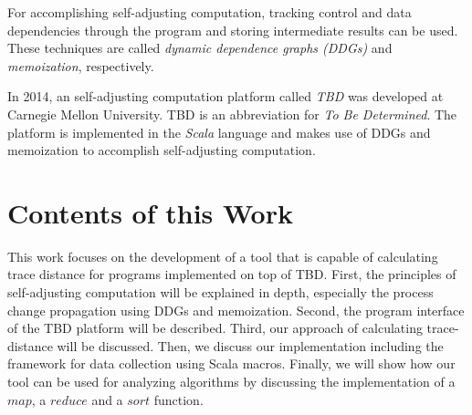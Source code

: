 For accomplishing self-adjusting computation, tracking control and data dependencies through the program and storing intermediate results can be used. These techniques are called \textit{dynamic dependence graphs (DDGs)} and \textit{memoization}, respectively. 

In 2014, an self-adjusting computation platform called \textit{TBD} was developed at Carnegie Mellon University. TBD is an abbreviation for \textit{To Be Determined}. The platform is implemented in the \textit{Scala} language and makes use of DDGs and memoization to accomplish self-adjusting computation. 

\section{Contents of this Work}

This work focuses on the development of a tool that is capable of calculating trace distance for programs implemented on top of TBD. First, the principles of self-adjusting computation will be explained in depth, especially the process change propagation using DDGs and memoization. Second, the program interface of the TBD platform will be described. Third, our approach of calculating trace-distance will be discussed. Then, we discuss our implementation including the framework for data collection using Scala macros. 
Finally, we will show how our tool can be used for analyzing algorithms by discussing the implementation of a $map$, a $reduce$ and a $sort$ function.  